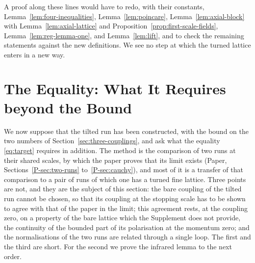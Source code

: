 \documentclass[11pt]{preprint}
\numberwithin{equation}{section}
\theoremstyle{definition}
\theoremstyle{remark}
\theoremstyle{plain}
\begin{document}
A proof along these lines would have to redo, with their constants, Lemma~\ref{lem:four-inequalities}, Lemma~\ref{lem:poincare}, Lemma~\ref{lem:axial-block} with Lemma~\ref{lem:axial-lattice} and Proposition~\ref{prop:first-scale-fields}, Lemma~\ref{lem:reg-lemma-one}, and Lemma~\ref{lem:lift}, and to check the remaining statements against the new definitions. We see no step at which the turned lattice enters in a new way.

\section{The Equality: What It Requires beyond the Bound}\label{sec:equality}

We now suppose that the tilted run has been constructed, with the bound on the two numbers of Section~\ref{sec:three-couplings}, and ask what the equality \eqref{eq:target} requires in addition. The method is the comparison of two runs at their shared scales, by which the paper proves that its limit exists (Paper, Sections~\ref{P-sec:two-runs} to~\ref{P-sec:cauchy}), and most of it is a transfer of that comparison to a pair of runs of which one has a turned fine lattice. Three points are not, and they are the subject of this section: the bare coupling of the tilted run cannot be chosen, so that its coupling at the stopping scale has to be shown to agree with that of the paper in the limit; this agreement rests, at the coupling zero, on a property of the bare lattice which the Supplement does not provide, the continuity of the bounded part of its polarisation at the momentum zero; and the normalisations of the two runs are related through a single loop. The first and the third are short. For the second we prove the infrared lemma to the next order.
\end{document}
